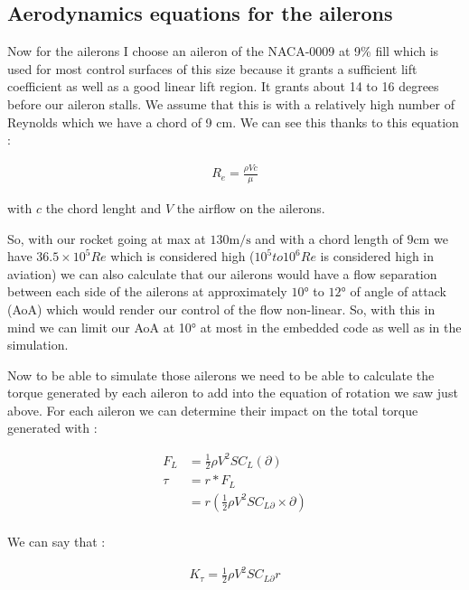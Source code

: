 \subsection{Aerodynamics equations for the ailerons}

Now for the ailerons I choose an aileron of the NACA-0009 at 9\% fill which is
used for most control surfaces of this size because it grants a sufficient lift
coefficient as well as a good linear lift region. It grants about 14 to 16
degrees before our aileron stalls. We assume that this is with a relatively
high number of Reynolds which we have a chord of 9 cm. We can see this thanks
to this equation :

\begin{gather*}
    R_e = \frac{\rho V c}{\mu}
\end{gather*}

with $c$ the chord lenght and $V$ the airflow on the ailerons.

So, with our rocket going at max at $130 \si{\meter\per\second}$ and with a
chord length of $9 \si{\centi\meter}$ we have $36.5 \times 10^5 Re$ which is
considered high ($10^5 to 10^6 Re$ is considered high in aviation) we can also
calculate that our ailerons would have a flow separation between each side of
the ailerons at approximately $10 \si{\degree}$ to $12 \si{\degree}$ of angle
of attack (AoA) which would render our control of the flow non-linear. So, with
this in mind we can limit our AoA at 10° at most in the embedded code as well
as in the simulation.

Now to be able to simulate those ailerons we need to be able to calculate the
torque generated by each aileron to add into the equation of rotation we saw
just above. For each aileron we can determine their impact on the total torque
generated with :

\begin{align*}
    F_L  & = \frac{1}{2} \rho V^2 S C_L (\partial)                      \\
    \tau & = r * F_L                                                    \\
         & = r ( \frac{1}{2} \rho V^2 S C_{L \partial} \times \partial) \\
\end{align*}

We can say that :

\begin{gather*}
    K_\tau = \frac{1}{2} \rho V^2 S C_{L \partial} r
\end{gather*}

